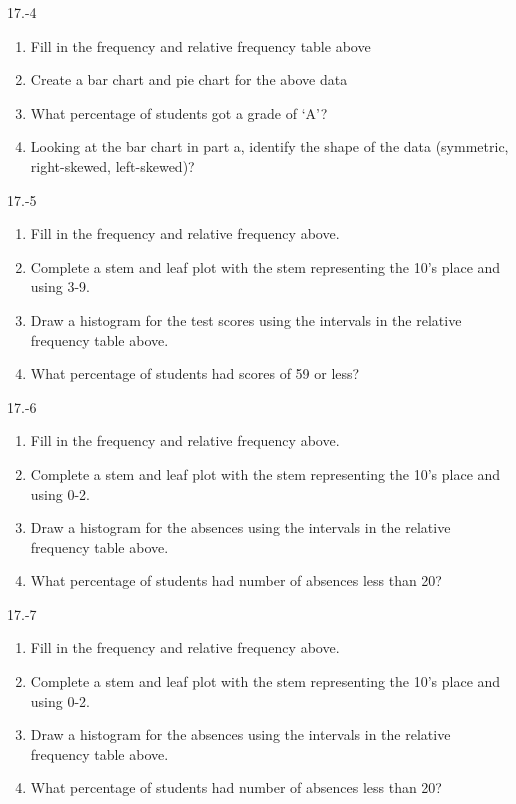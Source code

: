 \begin{exsol@solution}{17.-4}
  \begin{enumerate}
  \item Fill in the frequency and relative frequency table above
  \item  Create a bar chart and pie chart for the above data
  \item  What percentage of students got a grade of `A'?
  \item  Looking at the bar chart in part a, identify the shape of the data (symmetric, right-skewed, left-skewed)?
\end{enumerate}

\end{exsol@solution}
\begin{exsol@solution}{17.-5}
  \begin{enumerate}
  \item Fill in the frequency and relative frequency above.
  \item	Complete a stem and leaf plot with the stem representing the 10’s place and using 3-9.
  \item Draw a histogram for the test scores using the intervals in the relative frequency table above.
  \item	What percentage of students had scores of 59 or less?
\end{enumerate}

\end{exsol@solution}
\begin{exsol@solution}{17.-6}
\begin{enumerate}
  \item	Fill in the frequency and relative frequency above.
  \item	Complete a stem and leaf plot with the stem representing the 10's place and using 0-2.
  \item	Draw a histogram for the absences using the intervals in the relative frequency table above.
  \item	What percentage of students had number of absences less than 20?
\end{enumerate}

\end{exsol@solution}
\begin{exsol@solution}{17.-7}
\begin{enumerate}
  \item	Fill in the frequency and relative frequency above.
  \item	Complete a stem and leaf plot with the stem representing the 10's place and using 0-2.
  \item	Draw a histogram for the absences using the intervals in the relative frequency table above.
  \item	What percentage of students had number of absences less than 20?
\end{enumerate}

\end{exsol@solution}
